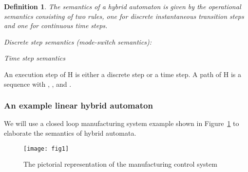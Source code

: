 \documentclass[10pt,journal,cspaper,compsoc]{IEEEtran}
\newtheorem{definition}{Definition}
\begin{document}
\begin{definition}
  The semantics of a hybrid automaton  is given by the operational
  semantics consisting of two rules, one for discrete instantaneous
  transition steps and one for continuous time steps.
  
  \begin{compactitem}
   
  \item Discrete step semantics (mode-switch semantics):
    
  
\item Time step semantics
    
  \end{compactitem}
\end{definition}

An execution step 
of H is either a discrete step or a time step. A path  of H is a
sequence  with
, , and
.

\subsubsection{An example linear hybrid automaton}
\label{sec:an-example-linear-1}

We will use a closed loop manufacturing system example shown in
Figure~\ref{fig:1} to elaborate the semantics of hybrid automata.

\begin{figure}[t!]
  \centering
  \texttt{[image: fig1]} 
  \caption{The pictorial representation of the manufacturing
  control system}
  \label{fig:1}
\end{figure}
\end{document}
